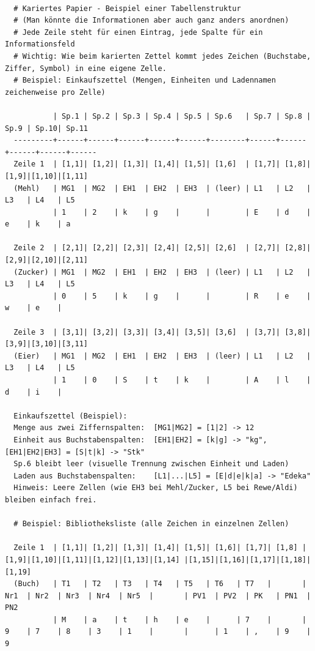 \documentclass{article}
\begin{document}
        \begin{verbatim}

  # Kariertes Papier - Beispiel einer Tabellenstruktur
  # (Man könnte die Informationen aber auch ganz anders anordnen)
  # Jede Zeile steht für einen Eintrag, jede Spalte für ein Informationsfeld
  # Wichtig: Wie beim karierten Zettel kommt jedes Zeichen (Buchstabe, Ziffer, Symbol) in eine eigene Zelle.
  # Beispiel: Einkaufszettel (Mengen, Einheiten und Ladennamen zeichenweise pro Zelle)
  
           | Sp.1 | Sp.2 | Sp.3 | Sp.4 | Sp.5 | Sp.6   | Sp.7 | Sp.8 | Sp.9 | Sp.10| Sp.11
  ---------+------+------+------+------+------+--------+------+------+------+------+------
  Zeile 1  | [1,1]| [1,2]| [1,3]| [1,4]| [1,5]| [1,6]  | [1,7]| [1,8]| [1,9]|[1,10]|[1,11]
  (Mehl)   | MG1  | MG2  | EH1  | EH2  | EH3  | (leer) | L1   | L2   | L3   | L4   | L5
           | 1    | 2    | k    | g    |      |        | E    | d    | e    | k    | a

  Zeile 2  | [2,1]| [2,2]| [2,3]| [2,4]| [2,5]| [2,6]  | [2,7]| [2,8]| [2,9]|[2,10]|[2,11]
  (Zucker) | MG1  | MG2  | EH1  | EH2  | EH3  | (leer) | L1   | L2   | L3   | L4   | L5
           | 0    | 5    | k    | g    |      |        | R    | e    | w    | e    |

  Zeile 3  | [3,1]| [3,2]| [3,3]| [3,4]| [3,5]| [3,6]  | [3,7]| [3,8]| [3,9]|[3,10]|[3,11]
  (Eier)   | MG1  | MG2  | EH1  | EH2  | EH3  | (leer) | L1   | L2   | L3   | L4   | L5
           | 1    | 0    | S    | t    | k    |        | A    | l    | d    | i    |

  Einkaufszettel (Beispiel):
  Menge aus zwei Ziffernspalten:  [MG1|MG2] = [1|2] -> 12
  Einheit aus Buchstabenspalten:  [EH1|EH2] = [k|g] -> "kg", [EH1|EH2|EH3] = [S|t|k] -> "Stk"
  Sp.6 bleibt leer (visuelle Trennung zwischen Einheit und Laden)
  Laden aus Buchstabenspalten:    [L1|...|L5] = [E|d|e|k|a] -> "Edeka"
  Hinweis: Leere Zellen (wie EH3 bei Mehl/Zucker, L5 bei Rewe/Aldi) bleiben einfach frei.

  # Beispiel: Bibliotheksliste (alle Zeichen in einzelnen Zellen)

  Zeile 1  | [1,1]| [1,2]| [1,3]| [1,4]| [1,5]| [1,6]| [1,7]| [1,8] | [1,9]|[1,10]|[1,11]|[1,12]|[1,13]|[1,14] |[1,15]|[1,16]|[1,17]|[1,18]|[1,19]
  (Buch)   | T1   | T2   | T3   | T4   | T5   | T6   | T7   |       | Nr1  | Nr2  | Nr3  | Nr4  | Nr5  |       | PV1  | PV2  | PK   | PN1  | PN2
           | M    | a    | t    | h    | e    |      | 7    |       | 9    | 7    | 8    | 3    | 1    |       |      | 1    | ,    | 9    | 9
  

\end{verbatim}
\end{document}
